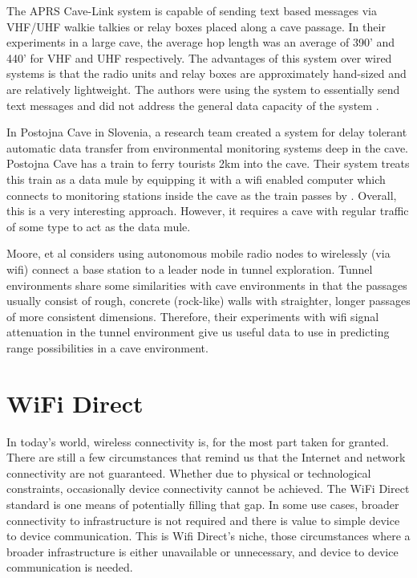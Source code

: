 \documentclass[10pt,twocolumn]{article}
\begin{document}
The APRS Cave-Link system is capable of sending text based messages via VHF/UHF walkie talkies or relay boxes placed along a cave passage.
In their experiments in a large cave, the average hop length was an average of 390' and 440' for VHF and UHF respectively.
The advantages of this system over wired systems is that the radio units and relay boxes are approximately hand-sized and are relatively lightweight.
The authors were using the system to essentially send text messages and did not address the general data capacity of the system \cite{cavelink}.

In Postojna Cave in Slovenia, a research team created a system for delay tolerant automatic data transfer from environmental monitoring systems deep in the cave.
Postojna Cave has a train to ferry tourists 2km into the cave.
Their system treats this train as a data mule by equipping it with a wifi enabled computer which connects to monitoring stations inside the cave as the train passes by \cite{postojna2014}.
Overall, this is a very interesting approach. 
However, it requires a cave with regular traffic of some type to act as the data mule.

Moore, et al \cite{moore2012} considers using autonomous mobile radio nodes to wirelessly (via wifi) connect a base station to a leader node in tunnel exploration. 
Tunnel environments share some similarities with cave environments in that the passages usually consist of rough, concrete (rock-like) walls with straighter, longer passages of more consistent dimensions. 
Therefore, their experiments with wifi signal attenuation in the tunnel environment give us useful data to use in predicting range possibilities in a cave environment.

\section{WiFi Direct}
In today's world, wireless connectivity is, for the most part taken for granted. 
There are still a few circumstances that remind us that the Internet and network connectivity are not guaranteed. 
Whether due to physical or technological constraints, occasionally device connectivity cannot be achieved. 
The WiFi Direct standard is one means of potentially filling that gap. 
In some use cases, broader connectivity to infrastructure is not required and there is value to simple device to device communication. 
This is Wifi Direct's niche, those circumstances where a broader infrastructure is either unavailable or unnecessary, and device to device communication is needed.
\end{document}
